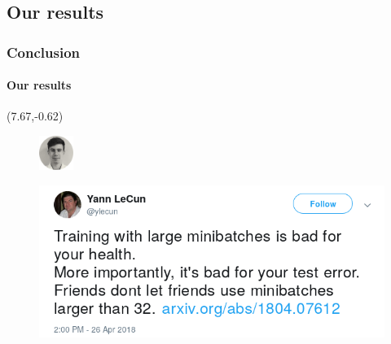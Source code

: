 \subsection{Our results}
\begin{frame}
\frametitle{Conclusion}
\framesubtitle{Our results}

\begin{textblock}{15}(7.67,-0.62)
	\begin{figure}[H]
		\includegraphics[width=0.1\textwidth]{Images/Team/DamienTOOMEY.png} 
	\end{figure}
\end{textblock}

\begin{figure}[H]
	\includegraphics[width=1\textwidth]{Images/quote_yann_lecun.png} 
\end{figure}

\end{frame}


